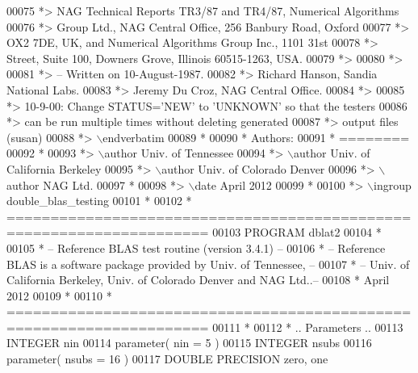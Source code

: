 \begin{DoxyCode}
00075 \textcolor{comment}{*>       NAG  Technical Reports TR3/87 and TR4/87,  Numerical Algorithms}
00076 \textcolor{comment}{*>       Group  Ltd.,  NAG  Central  Office,  256  Banbury  Road, Oxford}
00077 \textcolor{comment}{*>       OX2 7DE, UK,  and  Numerical Algorithms Group Inc.,  1101  31st}
00078 \textcolor{comment}{*>       Street,  Suite 100,  Downers Grove,  Illinois 60515-1263,  USA.}
00079 \textcolor{comment}{*>}
00080 \textcolor{comment}{*>}
00081 \textcolor{comment}{*> -- Written on 10-August-1987.}
00082 \textcolor{comment}{*>    Richard Hanson, Sandia National Labs.}
00083 \textcolor{comment}{*>    Jeremy Du Croz, NAG Central Office.}
00084 \textcolor{comment}{*>}
00085 \textcolor{comment}{*>    10-9-00:  Change STATUS='NEW' to 'UNKNOWN' so that the testers}
00086 \textcolor{comment}{*>              can be run multiple times without deleting generated}
00087 \textcolor{comment}{*>              output files (susan)}
00088 \textcolor{comment}{*> \(\backslash\)endverbatim}
00089 \textcolor{comment}{*}
00090 \textcolor{comment}{*  Authors:}
00091 \textcolor{comment}{*  ========}
00092 \textcolor{comment}{*}
00093 \textcolor{comment}{*> \(\backslash\)author Univ. of Tennessee }
00094 \textcolor{comment}{*> \(\backslash\)author Univ. of California Berkeley }
00095 \textcolor{comment}{*> \(\backslash\)author Univ. of Colorado Denver }
00096 \textcolor{comment}{*> \(\backslash\)author NAG Ltd. }
00097 \textcolor{comment}{*}
00098 \textcolor{comment}{*> \(\backslash\)date April 2012}
00099 \textcolor{comment}{*}
00100 \textcolor{comment}{*> \(\backslash\)ingroup double\_blas\_testing}
00101 \textcolor{comment}{*}
00102 \textcolor{comment}{*  =====================================================================}
00103       \textcolor{keyword}{PROGRAM} dblat2
00104 \textcolor{comment}{*}
00105 \textcolor{comment}{*  -- Reference BLAS test routine (version 3.4.1) --}
00106 \textcolor{comment}{*  -- Reference BLAS is a software package provided by Univ. of Tennessee,    --}
00107 \textcolor{comment}{*  -- Univ. of California Berkeley, Univ. of Colorado Denver and NAG Ltd..--}
00108 \textcolor{comment}{*     April 2012}
00109 \textcolor{comment}{*}
00110 \textcolor{comment}{*  =====================================================================}
00111 \textcolor{comment}{*}
00112 \textcolor{comment}{*     .. Parameters ..}
00113       \textcolor{keywordtype}{INTEGER}            nin
00114       parameter( nin = 5 )
00115       \textcolor{keywordtype}{INTEGER}            nsubs
00116       parameter( nsubs = 16 )
00117       \textcolor{keywordtype}{DOUBLE PRECISION}   zero, one

\end{DoxyCode}
